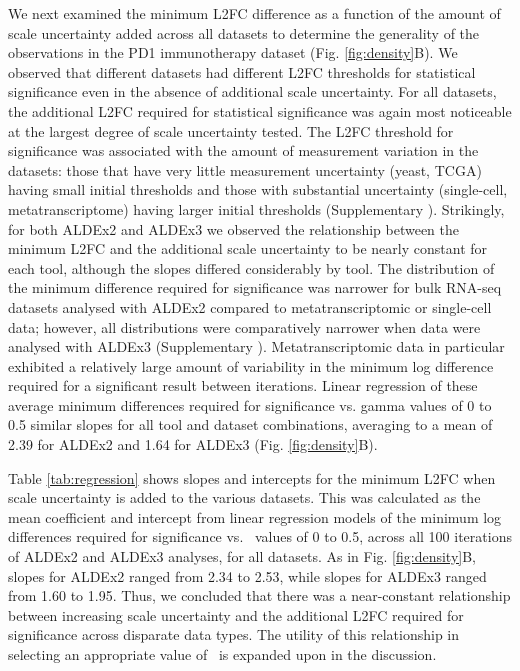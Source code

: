\documentclass[10pt,letterpaper]{article}
\begin{document}
We next examined the minimum L2FC difference as a function of the amount of scale uncertainty added across all datasets to determine the generality of the observations in the PD1 immunotherapy dataset (Fig. \ref{fig:density}B). We observed that different datasets had different L2FC thresholds for statistical significance even in the absence of additional scale uncertainty. For all datasets, the additional L2FC required for statistical significance was again most noticeable at the largest degree of scale uncertainty tested. The L2FC threshold for significance was associated with the amount of measurement variation in the datasets: those that have very little measurement uncertainty (yeast, TCGA) having small initial thresholds and those with substantial uncertainty (single-cell, metatranscriptome) having larger initial thresholds (Supplementary ). Strikingly, for both ALDEx2 and ALDEx3 we observed the relationship between the minimum L2FC and the additional scale uncertainty to be nearly constant for each tool, although the slopes differed considerably by tool. The distribution of the minimum difference required for significance was narrower for bulk RNA-seq datasets analysed with ALDEx2 compared to metatranscriptomic or single-cell data; however, all distributions were comparatively narrower when data were analysed with ALDEx3 (Supplementary ). Metatranscriptomic data in particular exhibited a relatively large amount of variability in the minimum log difference required for a significant result between iterations. Linear regression of these average minimum differences required for significance vs. gamma values of 0 to 0.5 similar slopes for all tool and dataset combinations, averaging to a mean of 2.39 for ALDEx2 and 1.64 for ALDEx3 (Fig. \ref{fig:density}B).

Table \ref{tab:regression} shows slopes and intercepts for the minimum L2FC when scale uncertainty is added to the various datasets. This was calculated as the mean coefficient and intercept from linear regression models of the minimum log differences required for significance vs. \textgamma~values of 0 to 0.5, across all 100 iterations of ALDEx2 and ALDEx3 analyses, for all datasets. As in Fig. \ref{fig:density}B, slopes for ALDEx2 ranged from 2.34 to 2.53, while slopes for ALDEx3 ranged from 1.60 to 1.95. Thus, we concluded that there was a near-constant relationship between increasing scale uncertainty and the additional L2FC required for significance across disparate data types. The utility of this relationship in selecting an appropriate value of \textgamma~is expanded upon in the discussion.
\end{document}
